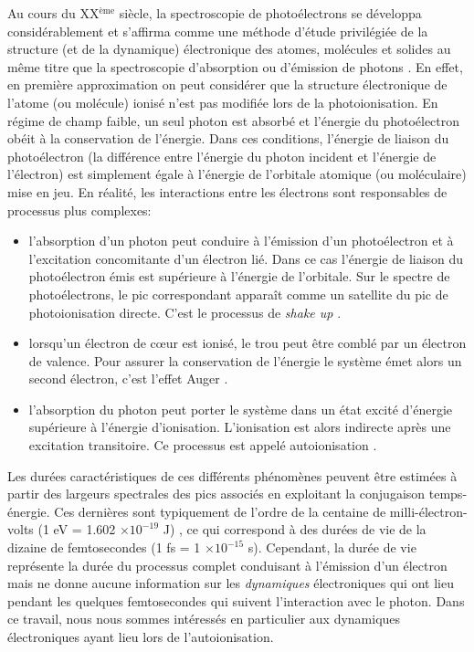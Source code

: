 Au cours du XX$^{\text{ème}}$ siècle, la spectroscopie de photoélectrons se développa considérablement et s'affirma comme une méthode d'étude privilégiée de la structure (et de la dynamique) électronique des atomes, molécules et solides au même titre que la spectroscopie d'absorption ou d'émission de photons . En effet, en première approximation on peut considérer que la structure électronique de l'atome (ou molécule) ionisé n'est pas modifiée lors de la photoionisation. En régime de champ faible, un seul photon est absorbé et l'énergie du photoélectron obéit à la conservation de l'énergie. Dans ces conditions, l'énergie de liaison du photoélectron (la différence entre l'énergie du photon incident et l'énergie de l'électron) est simplement égale à l'énergie de l'orbitale atomique (ou moléculaire) mise en jeu. En réalité, les interactions entre les électrons sont responsables de processus plus complexes:
\begin{itemize}
\item l'absorption d'un photon peut conduire à l'émission d'un photoélectron et à l'excitation concomitante d'un électron lié. Dans ce cas l'énergie de liaison du photoélectron émis est supérieure à l'énergie de l'orbitale. Sur le spectre de photoélectrons, le pic correspondant apparaît comme un satellite du pic de photoionisation directe. C'est le processus de \textit{shake up} .
\item lorsqu'un électron de c\oe ur est ionisé, le trou peut être comblé par un électron de valence. Pour assurer la conservation de l'énergie le système émet alors un second électron, c'est l'effet Auger .
\item l'absorption du photon peut porter le système dans un état excité d'énergie supérieure à l'énergie d'ionisation. L'ionisation est alors indirecte après une excitation transitoire. Ce processus est appelé autoionisation .
\end{itemize}
Les durées caractéristiques de ces différents phénomènes peuvent être estimées à partir des largeurs spectrales des pics associés en exploitant la conjugaison temps-énergie. Ces dernières sont typiquement de l'ordre de la centaine de milli-électron-volts (1 eV = 1.602 $\times 10^{-19}$ J) , ce qui correspond à des durées de vie de la dizaine de femtosecondes (1 fs = 1 $\times 10^{-15}$ s). Cependant, la durée de vie représente la durée du processus complet conduisant à l'émission d'un électron mais ne donne aucune information sur les \textit{dynamiques} électroniques qui ont lieu pendant les quelques femtosecondes qui suivent l'interaction avec le photon. Dans ce travail, nous nous sommes intéressés en particulier aux dynamiques électroniques ayant lieu lors de l'autoionisation.

